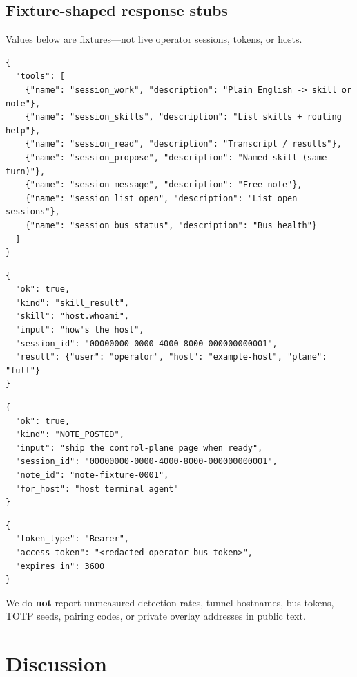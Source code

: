 \documentclass[11pt,a4paper]{article}
\begin{document}
\subsection{Fixture-shaped response stubs}

Values below are fixtures---not live operator sessions, tokens, or hosts.

\begin{lstlisting}[language={},caption={tools/list excerpt (fixture)},label={lst:tools}]
{
  "tools": [
    {"name": "session_work", "description": "Plain English -> skill or note"},
    {"name": "session_skills", "description": "List skills + routing help"},
    {"name": "session_read", "description": "Transcript / results"},
    {"name": "session_propose", "description": "Named skill (same-turn)"},
    {"name": "session_message", "description": "Free note"},
    {"name": "session_list_open", "description": "List open sessions"},
    {"name": "session_bus_status", "description": "Bus health"}
  ]
}
\end{lstlisting}

\begin{lstlisting}[language={},caption={session\_work matched skill (fixture)},label={lst:match}]
{
  "ok": true,
  "kind": "skill_result",
  "skill": "host.whoami",
  "input": "how's the host",
  "session_id": "00000000-0000-4000-8000-000000000001",
  "result": {"user": "operator", "host": "example-host", "plane": "full"}
}
\end{lstlisting}

\begin{lstlisting}[language={},caption={session\_work unmatched note (fixture)},label={lst:note}]
{
  "ok": true,
  "kind": "NOTE_POSTED",
  "input": "ship the control-plane page when ready",
  "session_id": "00000000-0000-4000-8000-000000000001",
  "note_id": "note-fixture-0001",
  "for_host": "host terminal agent"
}
\end{lstlisting}

\begin{lstlisting}[language={},caption={OAuth token shape (secret redacted)},label={lst:oauth}]
{
  "token_type": "Bearer",
  "access_token": "<redacted-operator-bus-token>",
  "expires_in": 3600
}
\end{lstlisting}

We do \textbf{not} report unmeasured detection rates, tunnel hostnames, bus tokens,
TOTP seeds, pairing codes, or private overlay addresses in public text.

\section{Discussion}
\end{document}
